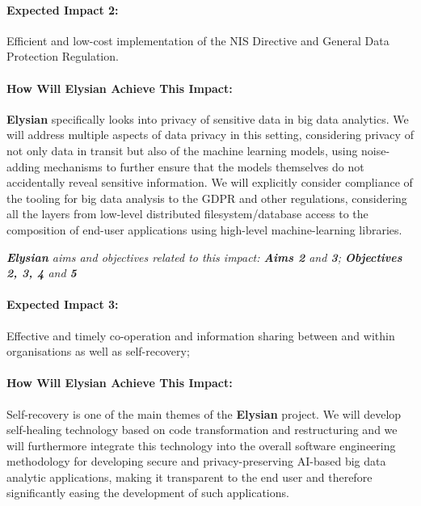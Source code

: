 \documentclass[a4paper,11pt]{article}
\newcommand{\project}[1]{\textbf{#1}\xspace}
\newcommand{\SECURITY}{\project{Elysian}}
\newcommand{\TheProject}{\SECURITY}
\begin{document}
\begin{mdframed}[backgroundcolor=blue!5]
\paragraph{Expected Impact 2:}
Efficient and low-cost implementation of the NIS Directive and General Data Protection Regulation.
\end{mdframed}

\begin{mdframed}[backgroundcolor=gray!10]
\paragraph{How Will \TheProject{} Achieve This Impact:}
\TheProject{} specifically looks into privacy of sensitive data in big data analytics. We will address multiple aspects of data privacy in this setting, considering privacy of not only data in transit but also of the machine learning models, using noise-adding mechanisms to further ensure that the models themselves do not accidentally reveal sensitive information. We will explicitly consider compliance of the tooling for big data analysis to the GDPR and other regulations, considering all the layers from low-level distributed filesystem/database access to the composition of end-user applications using high-level machine-learning libraries.

\emph{\TheProject{} aims and objectives related to this impact: \textbf{Aims 2}  and \textbf{3}; \textbf{Objectives 2, 3, 4} and \textbf{5} }
\end{mdframed}

\begin{mdframed}[backgroundcolor=blue!5]
\paragraph{Expected Impact 3:}
Effective and timely co-operation and information sharing between and within organisations as well as self-recovery;
\end{mdframed}

\begin{mdframed}[backgroundcolor=gray!10]
\paragraph{How Will \TheProject{} Achieve This Impact:}
Self-recovery is one of the main themes of the \TheProject{} project. We will develop self-healing technology based on code transformation and restructuring and we will furthermore integrate this technology into the overall software engineering methodology for developing secure and privacy-preserving AI-based big data analytic applications, making it transparent to the end user and therefore significantly easing the development of such applications. 
\end{mdframed}
\end{document}
